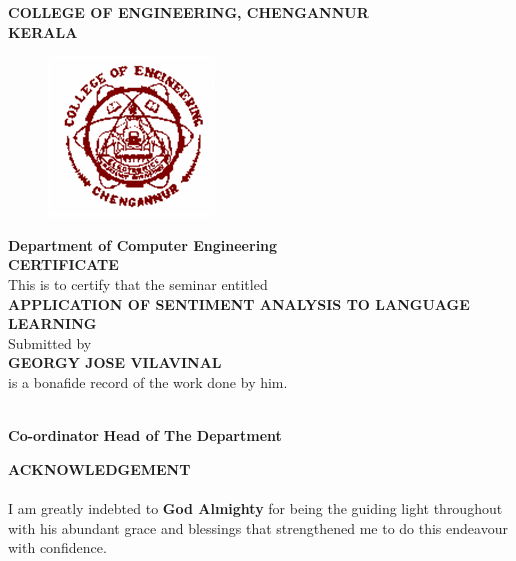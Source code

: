 \documentclass[a4paper,12pt,oneside]{article}
\begin{document}
\newpage
\thispagestyle{empty}
\begin{center}
\setlength{\baselineskip}{1.5\baselineskip}
{\large\textbf{COLLEGE OF ENGINEERING, CHENGANNUR}}
\\
{\large\textbf{KERALA}}
\\
\begin{figure}[H]
\centering
\includegraphics{ceclogo.png}
\end{figure}
\setlength{\baselineskip}{1.5\baselineskip}
\textbf{Department of Computer Engineering}
\\
\textbf{CERTIFICATE}
\\
This is to certify that the seminar entitled
\\
\textbf{APPLICATION OF SENTIMENT ANALYSIS TO LANGUAGE LEARNING}
\\
Submitted by
\\
\textbf{GEORGY JOSE VILAVINAL}
\\
is a bonafide record of the work done by him.
\end{center}
\vspace{14ex}
\hspace{55ex}
\\
\vspace{2ex}
\hspace{0ex}
\textbf{
Co-ordinator}
\hspace{45ex}
\textbf{
Head of The Department}
\newpage
{}
\renewcommand{\headrulewidth}{0.0pt}
\renewcommand{\footrulewidth}{0.0pt}
\begin{center}
\large{\textbf{ACKNOWLEDGEMENT}}
\end{center}
\vspace{6ex}
\setlength{\baselineskip}{1.5\baselineskip}
\paragraph{}
I am greatly indebted to \textbf{God Almighty} for being the guiding light throughout with his
abundant grace and blessings that strengthened me to do this endeavour with confidence.
\end{document}
